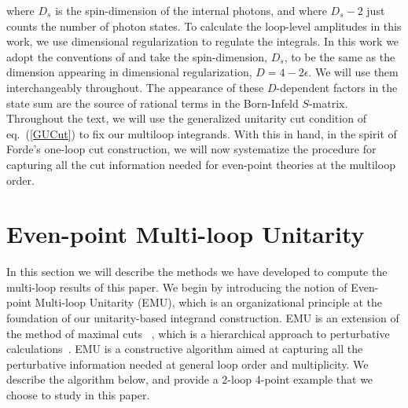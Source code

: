 \documentclass[11pt,letter]{article}
\def\eqn#1{eq.~(\ref{#1})}
\begin{document}
 where $D_s$ is the spin-dimension of the internal photons, and where $D_s-2$ just counts the number of photon states. To calculate the loop-level amplitudes in this work, we use dimensional regularization to regulate the integrals. In this work we adopt the conventions of  \cite{collins_1984,Bern:2002zk} and take the spin-dimension, $D_s$, to be
the same as the dimension appearing in dimensional regularization, $D=4-2\epsilon$. We will use them interchangeably throughout. The appearance of these $D$-dependent factors in the state sum are the source of rational terms in the Born-Infeld $S$-matrix. Throughout the text, we will use the generalized unitarity cut condition of \eqn{GUCut} to fix our multiloop integrands. With this in hand, in the spirit of Forde's one-loop cut construction, we will now systematize the procedure for capturing all the cut information needed for even-point theories at the multiloop order. 


\section{Even-point Multi-loop Unitarity}
\label{sec:EMU}
In this section we will describe the methods we have developed to compute the multi-loop results of this paper. We begin by introducing the notion of {Even-point Multi-loop Unitarity} (EMU), which is an organizational principle at the foundation of our unitarity-based integrand construction. EMU is an extension of the method of maximal cuts~\cite{Bern:2007ct} , which is a hierarchical approach to perturbative calculations~\cite{Carrasco:2021bmu}.  EMU is a {constructive} algorithm aimed at capturing all the perturbative information needed at general loop order and multiplicity. We describe the algorithm below, and provide a 2-loop 4-point example that we choose to study in this paper.
\end{document}
